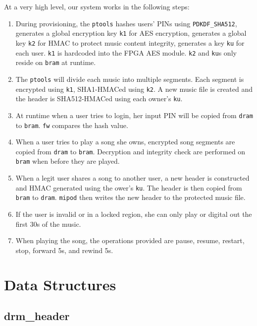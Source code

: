 \documentclass[11pt]{extarticle}
\begin{document}
At a very high level, our system works in the following steps: 

\begin{enumerate}
	\item During provisioning, the \verb|ptools| hashes users' PINs using \verb|PDKDF_SHA512|, generates a global encryption key \verb|k1| for AES encryption, generates a global key \verb|k2| for HMAC to protect music content integrity, generates a key \verb|ku| for each user. \verb|k1| is hardcoded into the FPGA AES module. \verb|k2| and \verb|ku|s only reside on \verb|bram| at runtime.
	\item The \verb|ptools| will divide each music into multiple segments. Each segment is encrypted using \verb|k1|, SHA1-HMACed using \verb|k2|. A new music file is created and the header is SHA512-HMACed using each owner's \verb|ku|.
	\item At runtime when a user tries to login, her input PIN will be copied from \verb|dram| to \verb|bram|. \verb|fw| compares the hash value.
	\item When a user tries to play a song she owns, encrypted song segments are copied from \verb|dram| to \verb|bram|. Decryption and integrity check are performed on \verb|bram| when before they are played.
	\item When a legit user shares a song to another user, a new header is constructed and HMAC generated using the ower's \verb|ku|. The header is then copied from \verb|bram| to \verb|dram|. \verb|mipod| then writes the new header to the protected music file. 
	\item If the user is invalid or in a locked region, she can only play or digital out the first 30s of the music.
	\item When playing the song, the operations provided are pause, resume, restart, stop, forward 5s, and rewind 5s.
\end{enumerate}

\section{Data Structures}

\subsection{drm\_header}
\end{document}
